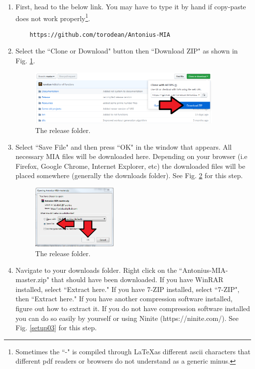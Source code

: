 \begin{enumerate}
	\item First, head to the below link. You may have to type it by hand if copy-paste does not work properly\footnote{Sometimes the ``-" is compiled through \LaTeX as different ascii characters that different pdf readers or browsers do not understand as a generic minus.}.

	\begin{lstlisting}
	https://github.com/torodean/Antonius-MIA
	\end{lstlisting}
	
	\item Select the ``Clone or Download" button then ``Download ZIP" as shown in Fig. \ref{setup01}.
	
	\begin{figure}[h]
		\centering
		\includegraphics[width=0.9\textwidth]{Images/setup01.png}
		\caption{The release folder.} \label{setup01}
	\end{figure}
	
	\item Select ``Save File" and then press ``OK" in the window that appears. All necessary MIA files will be downloaded here. Depending on your browser (i.e Firefox, Google Chrome, Internet Explorer, etc) the downloaded files will be placed somewhere (generally the downloads folder). See Fig. \ref{setup02} for this step.
	
	\begin{figure}[h]
		\centering
		\includegraphics[width=0.4\textwidth]{Images/setup02.png}
		\caption{The release folder.} \label{setup02}
	\end{figure}
	
	\item Navigate to your downloads folder. Right click on the ``Antonius-MIA-master.zip" that should have been downloaded. If you have WinRAR installed, select ``Extract here." If you have 7-ZIP installed, select ``7-ZIP", then ``Extract here." If you have another compression software installed, figure out how to extract it. If you do not have compression software installed you can do so easily by yourself or using Ninite (https://ninite.com/). See Fig. \ref{setup03} for this step.
	

\end{enumerate}
